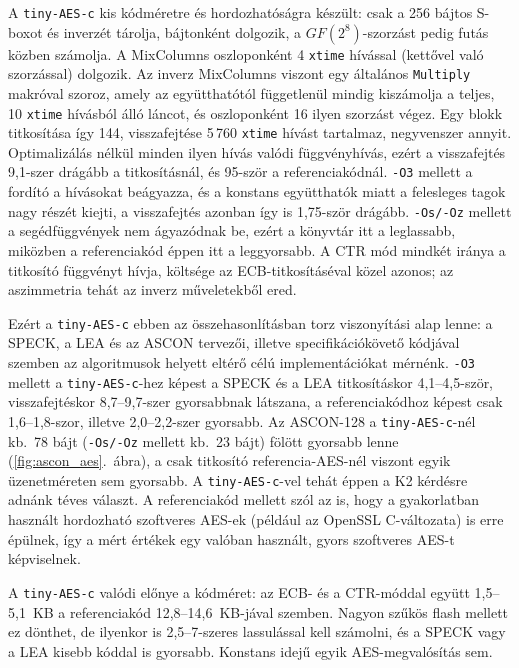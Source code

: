 \documentclass[a4paper,12pt]{report}
\theoremstyle{definition}
\theoremstyle{remark}
\begin{document}
A \texttt{tiny-AES-c} kis kódméretre és hordozhatóságra készült: csak a 256 bájtos S-boxot és inverzét tárolja, bájtonként dolgozik, a $GF(2^8)$-szorzást pedig futás közben számolja. A MixColumns oszloponként 4 \texttt{xtime} hívással (kettővel való szorzással) dolgozik. Az inverz MixColumns viszont egy általános \texttt{Multiply} makróval szoroz, amely az együtthatótól függetlenül mindig kiszámolja a teljes, 10 \texttt{xtime} hívásból álló láncot, és oszloponként 16 ilyen szorzást végez. Egy blokk titkosítása így 144, visszafejtése 5\,760 \texttt{xtime} hívást tartalmaz, negyvenszer annyit. Optimalizálás nélkül minden ilyen hívás valódi függvényhívás, ezért a visszafejtés 9,1-szer drágább a titkosításnál, és 95-ször a referenciakódnál. \texttt{-O3} mellett a fordító a hívásokat beágyazza, és a konstans együtthatók miatt a felesleges tagok nagy részét kiejti, a visszafejtés azonban így is 1,75-ször drágább. \texttt{-Os/-Oz} mellett a segédfüggvények nem ágyazódnak be, ezért a könyvtár itt a leglassabb, miközben a referenciakód éppen itt a leggyorsabb. A CTR mód mindkét iránya a titkosító függvényt hívja, költsége az ECB-titkosításéval közel azonos; az aszimmetria tehát az inverz műveletekből ered.

Ezért a \texttt{tiny-AES-c} ebben az összehasonlításban torz viszonyítási alap lenne: a SPECK, a LEA és az ASCON tervezői, illetve specifikációkövető kódjával szemben az algoritmusok helyett eltérő célú implementációkat mérnénk. \texttt{-O3} mellett a \texttt{tiny-AES-c}-hez képest a SPECK és a LEA titkosításkor 4,1--4,5-ször, visszafejtéskor 8,7--9,7-szer gyorsabbnak látszana, a referenciakódhoz képest csak 1,6--1,8-szor, illetve 2,0--2,2-szer gyorsabb. Az ASCON-128 a \texttt{tiny-AES-c}-nél kb.\ 78 bájt (\texttt{-Os/-Oz} mellett kb.\ 23 bájt) fölött gyorsabb lenne (\ref{fig:ascon_aes}.~ábra), a csak titkosító referencia-AES-nél viszont egyik üzenetméreten sem gyorsabb. A \texttt{tiny-AES-c}-vel tehát éppen a K2 kérdésre adnánk téves választ. A referenciakód mellett szól az is, hogy a gyakorlatban használt hordozható szoftveres AES-ek (például az OpenSSL C-változata) is erre épülnek, így a mért értékek egy valóban használt, gyors szoftveres AES-t képviselnek.

A \texttt{tiny-AES-c} valódi előnye a kódméret: az ECB- és a CTR-móddal együtt 1,5--5,1~KB a referenciakód 12,8--14,6~KB-jával szemben. Nagyon szűkös flash mellett ez dönthet, de ilyenkor is 2,5--7-szeres lassulással kell számolni, és a SPECK vagy a LEA kisebb kóddal is gyorsabb. Konstans idejű egyik AES-megvalósítás sem.
\end{document}
